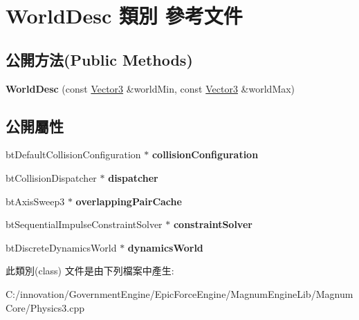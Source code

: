 \hypertarget{class_world_desc}{}\section{World\+Desc 類別 參考文件}
\label{class_world_desc}
\subsection*{公開方法(Public Methods)}
\begin{DoxyCompactItemize}
\item 
{\bfseries World\+Desc} (const \hyperlink{class_i_dream_sky_1_1_vector3}{Vector3} \&world\+Min, const \hyperlink{class_i_dream_sky_1_1_vector3}{Vector3} \&world\+Max)\hypertarget{class_world_desc_a2a513c20564b3b07770895d2018c9d57}{}\label{class_world_desc_a2a513c20564b3b07770895d2018c9d57}

\end{DoxyCompactItemize}
\subsection*{公開屬性}
\begin{DoxyCompactItemize}
\item 
bt\+Default\+Collision\+Configuration $\ast$ {\bfseries collision\+Configuration}\hypertarget{class_world_desc_a180f1ad6c916ab8d14458c84f876592a}{}\label{class_world_desc_a180f1ad6c916ab8d14458c84f876592a}

\item 
bt\+Collision\+Dispatcher $\ast$ {\bfseries dispatcher}\hypertarget{class_world_desc_a680db4ee4aca63042a09913ee3d6252d}{}\label{class_world_desc_a680db4ee4aca63042a09913ee3d6252d}

\item 
bt\+Axis\+Sweep3 $\ast$ {\bfseries overlapping\+Pair\+Cache}\hypertarget{class_world_desc_a84b5dd938eedcef884ca75949b93ebba}{}\label{class_world_desc_a84b5dd938eedcef884ca75949b93ebba}

\item 
bt\+Sequential\+Impulse\+Constraint\+Solver $\ast$ {\bfseries constraint\+Solver}\hypertarget{class_world_desc_aaff4a0c58b8292634b6d8c1779097429}{}\label{class_world_desc_aaff4a0c58b8292634b6d8c1779097429}

\item 
bt\+Discrete\+Dynamics\+World $\ast$ {\bfseries dynamics\+World}\hypertarget{class_world_desc_a28f3a8078b13c87ff1fd1cfeb07be5e5}{}\label{class_world_desc_a28f3a8078b13c87ff1fd1cfeb07be5e5}

\end{DoxyCompactItemize}


此類別(class) 文件是由下列檔案中產生\+:\begin{DoxyCompactItemize}
\item 
C\+:/innovation/\+Government\+Engine/\+Epic\+Force\+Engine/\+Magnum\+Engine\+Lib/\+Magnum\+Core/Physics3.\+cpp\end{DoxyCompactItemize}
